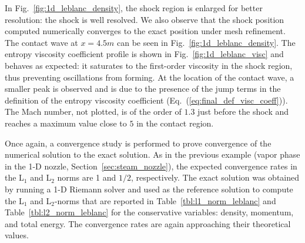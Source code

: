 \documentclass[review,10pt]{elsarticle}
\newcommand{\eqt}[1]{Eq.~(\ref{#1})}                     %
\newcommand{\fig}[1]{Fig.~\ref{#1}}                      %
\newcommand{\tbl}[1]{Table~\ref{#1}}                     %
\newcommand{\sct}[1]{Section~\ref{#1}}                   %
\begin{document}
%
In \fig{fig:1d_leblanc_density}, 
the shock region is enlarged for better resolution: the shock is well resolved. We also observe that the shock 
position computed numerically converges to the exact position under mesh refinement. The contact wave at $x=4.5m$ 
can be seen in \fig{fig:1d_leblanc_density}. The entropy viscosity coefficient profile is shown in 
\fig{fig:1d_leblanc_visc} and behaves as expected: it saturates to the first-order viscosity in the 
shock region, thus preventing oscillations from forming. At the location of the contact wave, a 
smaller peak is observed and is due to the presence of the jump terms in the definition of the entropy 
viscosity coefficient (\eqt{eq:final_def_visc_coeff}).  The Mach number, not plotted, is of the order 
of $1.3$ just before the shock and reaches a maximum value close to $5$ in the contact region.

Once again, a convergence study is performed to prove convergence of the numerical solution to 
the exact solution. As in the previous example (vapor phase in the 1-D nozzle, \sct{sec:steam_nozzle}), 
the expected convergence rates in the L$_1$ and L$_2$ norms are 1 and $1/2$, respectively. The exact 
solution was obtained by running a 1-D Riemann solver and used as the reference solution to compute 
the L$_1$ and L$_2$-norms that are reported in \tbl{tbl:l1_norm_leblanc} and \tbl{tbl:l2_norm_leblanc} 
for the conservative variables: density, momentum, and total energy. The convergence rates are again approaching their theoretical values.
\end{document}
